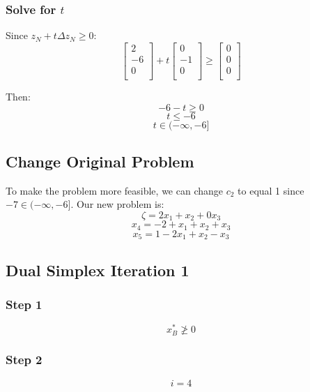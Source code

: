 \documentclass[14pt]{extarticle}
\begin{document}
\subsubsection*{Solve for $t$}
Since $z_N + t\Delta z_N \geq 0$:
\[
    \begin{bmatrix}
        2 \\
        -6 \\
        0 \\
    \end{bmatrix}
    + t \begin{bmatrix}
        0 \\
        -1 \\
        0 \\
    \end{bmatrix}
    \geq \begin{bmatrix}
        0 \\
        0 \\
        0 \\
    \end{bmatrix}
\]

\bigskip Then:
\[
    -6 - t \geq 0
\]
\[
    t \leq -6
\]
\[
    t \in (-\infty, -6]
\]

\subsection*{Change Original Problem}
To make the problem more feasible, we can change $c_2$ to equal 1 since $-7 \in (-\infty, -6]$. Our new problem is:
\[
    \zeta = 2x_1 + x_2 + 0x_3
\]
\[
    x_4 = -2 + x_1 + x_2 + x_3
\]
\[
    x_5 = 1 - 2x_1 + x_2 - x_3
\]

\subsection*{Dual Simplex Iteration 1}
\subsubsection*{Step 1}
\[
    x^*_B \ngeq 0
\]

\subsubsection*{Step 2}
\[
    i = 4
\]
\end{document}
